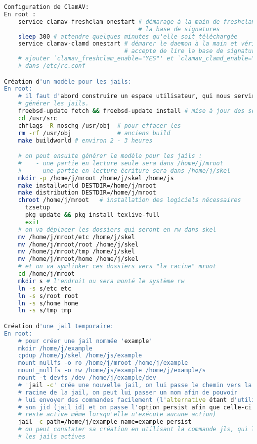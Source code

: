 \documentclass[10pt,a4paper]{article}
\begin{document}
\begin{lstlisting}[language=bash]
Configuration de ClamAV:
En root :
    service clamav-freshclam onestart # démarage à la main de freshclam pour télécharger
                                      # la base de signatures
    sleep 300 # attendre quelques minutes qu'elle soit téléchargée
    service clamav-clamd onestart # démarer le daemon à la main et vérifier qu'il
                                  # accepte de lire la base de signatures
    # ajouter `clamav_freshclam_enable="YES"' et `clamav_clamd_enable="YES"'
    # dans /etc/rc.conf

Création d'un modèle pour les jails:
En root:
    # il faut d'abord construire un espace utilisateur, qui nous servira à
    # générer les jails.
    freebsd-update fetch && freebsd-update install # mise à jour des sources
    cd /usr/src
    chflags -R noschg /usr/obj  # pour effacer les
    rm -rf /usr/obj             # anciens build
    make buildworld # environ 2 - 3 heures

    # on peut ensuite générer le modèle pour les jails :
    #    - une partie en lecture seule sera dans /home/j/mroot
    #    - une partie en lecture écriture sera dans /home/j/skel
    mkdir -p /home/j/mroot /home/j/skel /home/js
    make installworld DESTDIR=/home/j/mroot
    make distribution DESTDIR=/home/j/mroot
    chroot /home/j/mroot   # installation des logiciels nécessaires
      tzsetup
      pkg update && pkg install texlive-full
      exit
    # on va déplacer les dossiers qui seront en rw dans skel
    mv /home/j/mroot/etc /home/j/skel
    mv /home/j/mroot/root /home/j/skel
    mv /home/j/mroot/tmp /home/j/skel
    mv /home/j/mroot/home /home/j/skel
    # et on va symlinker ces dossiers vers "la racine" mroot
    cd /home/j/mroot
    mkdir s # l'endroit ou sera monté le système rw
    ln -s s/etc etc
    ln -s s/root root
    ln -s s/home home
    ln -s s/tmp tmp

Création d'une jail temporaire:
En root:
    # pour créer une jail nommée 'example'
    mkdir /home/j/example
    cpdup /home/j/skel /home/js/example
    mount_nullfs -o ro /home/j/mroot /home/j/example
    mount_nullfs -o rw /home/js/example /home/j/example/s
    mount -t devfs /dev /home/j/example/dev
    # 'jail -c' crée une nouvelle jail, on lui passe le chemin vers la
    # racine de la jail, on peut lui passer un nom afin de pouvoir
    # lui envoyer des commandes facilement (l'alternative étant d'utiliser
    # son jid (jail id) et on passe l'option persist afin que celle-ci
    # reste active même lorsqu'elle n'exécute aucune action)
    jail -c path=/home/j/example name=example persist
    # on peut constater sa création en utilisant la commande jls, qui liste
    # les jails actives


\end{lstlisting}
\end{document}
